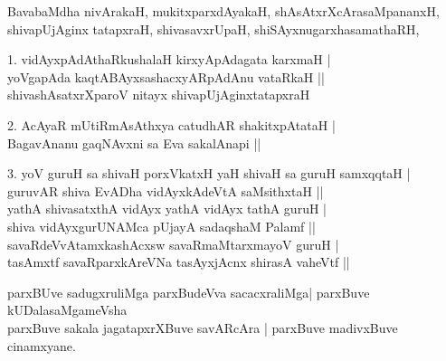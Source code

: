 \begin{entry}
\medskip

\begin{shl}
BavabaMdha nivArakaH, mukitxparxdAyakaH, shAsAtxrXcArasaMpananxH,\\
shivapUjAginx tatapxraH, shivasavxrUpaH, shiSAyxnugarxhasamathaRH,
\end{shl}
\smallskip
\begin{shl}
1. vidAyxpAdAthaRkushalaH kirxyApAdagata karxmaH |\\
yoVgapAda kaqtABAyxsashacxyARpAdAnu vataRkaH ||\\
shivashAsatxrXparoV nitayx shivapUjAginxtatapxraH
\end{shl}
\smallskip
\begin{shl}
2. AcAyaR mUtiRmAsAthxya catudhAR shakitxpAtataH |\\
BagavAnanu gaqNAvxni sa Eva sakalAnapi ||
\end{shl}
\smallskip
\begin{shl}
3. yoV guruH sa shivaH porxVkatxH yaH shivaH sa guruH samxqqtaH |\\
guruvAR shiva EvADha vidAyxkAdeVtA saMsithxtaH ||\\
yathA shivasatxthA vidAyx yathA vidAyx tathA guruH |\\
shiva vidAyxgurUNAMca pUjayA sadaqshaM Palamf ||\\
savaRdeVvAtamxkashAcxsw savaRmaMtarxmayoV guruH |\\
tasAmxtf savaRparxkAreVNa tasAyxjAcnx shirasA vaheVtf ||
\end{shl}
\smallskip
{}
\end{entry}

\begin{entry}
\smallskip
\begin{shl}
parxBUve sadugxruliMga parxBudeVva sacacxraliMga| parxBuve
kUDalasaMgameVsha\\
parxBuve sakala jagatapxrXBuve savARcAra | parxBuve madivxBuve cinamxyane.
\end{shl}
\smallskip
{}
\smallskip
{}
\end{entry}

